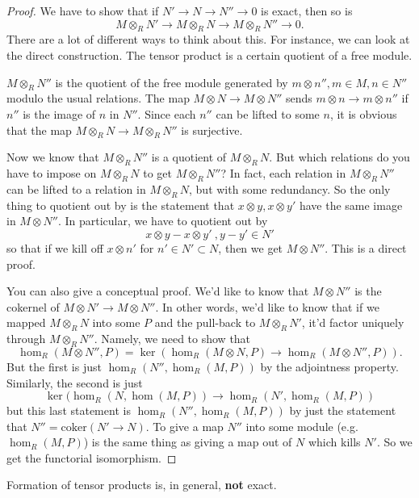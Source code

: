 \begin{proof} 
We have to show that if $N' \to N \to N'' \to 0$ is exact, then so is
\[ M \otimes_R N' \to M \otimes_R N \to M \otimes_R N'' \to 0.  \]
There are a lot of different ways to think about this. For instance, we can
look at the direct construction.  The tensor product is a certain quotient of a
free module.  

$M \otimes_R N''$ is the quotient of the free module generated by $m \otimes
n'', m \in M, n \in N''$ modulo the usual relations.  The map $M \otimes N \to
M \otimes N''$ sends $m \otimes n \to m \otimes n''$ if $n'' $ is the image of
$n$ in $N''$. Since each $n''$ can be lifted to some $n$, it is obvious that
the map $M \otimes_R N \to M \otimes_R N''$ is surjective.

Now we know that $M \otimes_R N''$ is a quotient of $M \otimes_R N$. But which
relations do you have to impose on $M \otimes_R N$ to get $M \otimes_R N''$? In fact, each relation in $M \otimes_R N''$
can be lifted to a relation in $M \otimes_R N$, but with some redundancy. So the only thing to quotient
out by is the statement that $x \otimes y, x \otimes y'$ have the same image in
$M \otimes N''$.  In particular, we have to quotient out by
\[ x \otimes y - x\otimes y' \ , y - y' \in N'   \]
so that if we kill off $x \otimes n'$ for $n' \in N' \subset N$, then we get $M
\otimes N''$. This is a direct proof.

You can also give a conceptual proof.  We'd like to know that $M \otimes N''$
is the cokernel of $M \otimes N' \to M \otimes N''$. In other words, we'd like
to know that if we mapped $M \otimes_R N$ into some $P$ and the pull-back to $M
\otimes_R N'$, it'd factor uniquely through $M \otimes_R N''$. 
Namely, we need to show that
\[ \hom_R(M \otimes N'', P) = \ker(\hom_R(M \otimes N, P) \to \hom_R(M
\otimes N'', P)).  \]
But the first is just $\hom_R(N'', \hom_R(M,P))$ by the adjointness property.
Similarly, the second is just
\[ \ker( \hom_R(N, \hom(M,P)) \to \hom_R(N', \hom_R(M,P))  \]
but this last statement is $\hom_R(N'', \hom_R(M,P))$ by just the statement that $N'' = \mathrm{coker}(N ' \to N)$.
To give a map $N'' $ into some module (e.g. $\hom_R(M,P)$) is the same thing as
giving a map out of $N$ which kills $N'$.
So we get the functorial isomorphism.
\end{proof} 

\begin{remark} 
Formation of tensor products is, in general, \textbf{not} exact.
\end{remark} 

